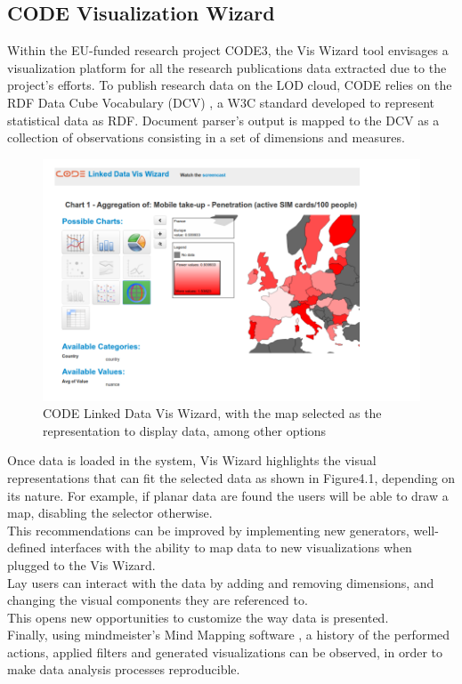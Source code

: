 \documentclass[a4paper,12pt,oneside]{report}
\begin{document}
{{{{\subsection{CODE Visualization Wizard}
{Within the EU-funded research project CODE3, the Vis Wizard tool  envisages a visualization platform for all the research publications data extracted due to the project’s efforts.
To publish research data on the LOD cloud, CODE relies on the RDF Data Cube Vocabulary (DCV) , a W3C standard developed to represent statistical data as RDF. Document parser’s output is mapped to the DCV as a collection of observations consisting in a set
of dimensions and measures.
\begin{figure}[h!]
\centering
\includegraphics[width=1\textwidth]{Capture9}
\caption{CODE Linked Data Vis Wizard, with the map selected as the representation to display data, among other options}
\end{figure}
Once data is loaded in the system, Vis Wizard highlights the visual representations that can fit the selected data as shown in Figure4.1, depending on its nature. For example, if planar data are found the users will be able to draw a map, disabling the selector otherwise.\\This
recommendations can be improved by implementing new generators, well-defined interfaces with the ability to map data to new visualizations when plugged to the Vis Wizard.\\
 Lay users can interact with the data by adding and removing dimensions, and changing the visual components they are referenced to.\\ This opens new opportunities to customize the way data is presented.\\
Finally, using mindmeister’s Mind Mapping software , a history of the performed actions, applied filters and generated visualizations can be observed, in order to make data analysis processes reproducible.}
}}}}
\end{document}
